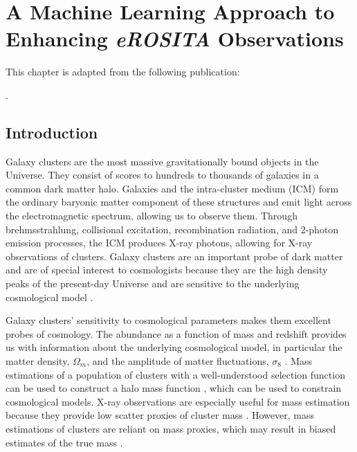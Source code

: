 \chapter{A Machine Learning Approach to Enhancing \textit{eROSITA} Observations} \label{chap:chap-2}



\begin{singlespace}         %
    This chapter is adapted from the following publication:
    
    . 
\end{singlespace} 



\section{Introduction}\label{ch2_introduction}

Galaxy clusters are the most massive gravitationally bound objects in the Universe. They consist of scores to hundreds to thousands of galaxies in a common dark matter halo. Galaxies and the intra-cluster medium (ICM) form the ordinary baryonic matter component of these structures and emit light across the electromagnetic spectrum, allowing us to observe them. Through brehmsstrahlung, collisional excitation, recombination radiation, and 2-photon emission processes, the ICM produces X-ray photons, allowing for X-ray observations of clusters. Galaxy clusters are an important probe of dark matter \cite[e.g.,][]{Clowe_2006} and are of special interest to cosmologists because they are the high density peaks of the present-day Universe and are sensitive to the underlying cosmological model \cite[see][for a recent review]{Pratt_2019}.

Galaxy clusters' sensitivity to cosmological parameters makes them excellent probes of cosmology. The abundance as a function of mass and redshift provides us with information about the underlying cosmological model, in particular the matter density, $\Omega_m$, and the amplitude of matter fluctuations, $\sigma_8$ \cite{Allen_2011, Kravtsov_Borgani_2012, Pratt_2019}. Mass estimations of a population of clusters with a well-understood selection function can be used to construct a halo mass function \cite[e.g.,][]{Tinker_2008, Bocquet_2016}, which can be used to constrain cosmological models. X-ray observations are especially useful for mass estimation because they provide low scatter proxies of cluster mass \cite[e.g.,][]{Kravtsov_2006}. However, mass estimations of clusters are reliant on mass proxies, which may result in biased estimates of the true mass \cite[e.g.,][]{Nagai_2007, Lau_2013, Nelson_2014, Shi_2016, Biffi_2016, Barnes_2021}. 

